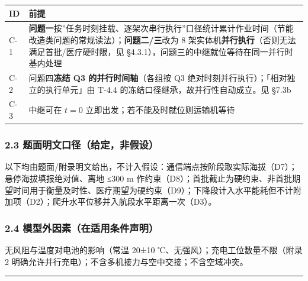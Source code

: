 \documentclass[
  10.5pt,
]{article}
\newcounter{none} %
\begin{document}
{\def\LTcaptype{none} %
\begin{longtable}[]{@{}
  >{\raggedright\arraybackslash}p{}
  >{\raggedright\arraybackslash}p{}@{}}
\toprule\noalign{}
\begin{minipage}[b]{\linewidth}\raggedright
ID
\end{minipage} & \begin{minipage}[b]{\linewidth}\raggedright
前提
\end{minipage} \\
\midrule\noalign{}
\endhead
\bottomrule\noalign{}
\endlastfoot
C-1 &
\textbf{问题一}按''任务时刻挂载、逐架次串行执行''口径统计累计作业时间（节能改造类问题的常规读法）；\textbf{问题二/三}改为
8 架实体机\textbf{并行执行}（否则无法满足首批/医疗硬时限，见
§4.3.1），问题三的中继就位等待在同一并行时基内处理 \\
C-2 & 问题四\textbf{冻结 Q3 的并行时间轴}（各组按 Q3
绝对时刻并行执行）；「相对独立的执行单元」由 T-4.4
的冻结口径继承，故并行性自动成立。见 §7.3b \\
C-3 & 中继可在 \(t=0\) 立即出发；若不能及时就位则运输机等待 \\
\end{longtable}
}

\subsubsection{2.3
题面明文口径（给定，非假设）}\label{ux9898ux9762ux660eux6587ux53e3ux5f84ux7ed9ux5b9aux975eux5047ux8bbe}

以下均由题面/附录明文给出，不计入假设：通信端点按阶段取实际海拔（D7）；悬停海拔填报绝对值、离地
≤300 m
作约束（D8）；首批截止为硬约束、非首批期望时间用于衡量及时性、医疗期望为硬约束（D9）；下降段计入水平能耗但不计附加项（D2）；爬升水平位移并入航段水平距离一次（D3）。

\subsubsection{2.4
模型外因素（在适用条件声明）}\label{ux6a21ux578bux5916ux56e0ux7d20ux5728ux9002ux7528ux6761ux4ef6ux58f0ux660e}

无风阻与温度对电池的影响（常温 20±10 ℃、无强风）；充电工位数量不限（附录
2 明确允许并行充电）；不含多机接力与空中交接；不含空域冲突。

\begin{center}\rule{0.5\linewidth}{0.5pt}\end{center}
\end{document}
